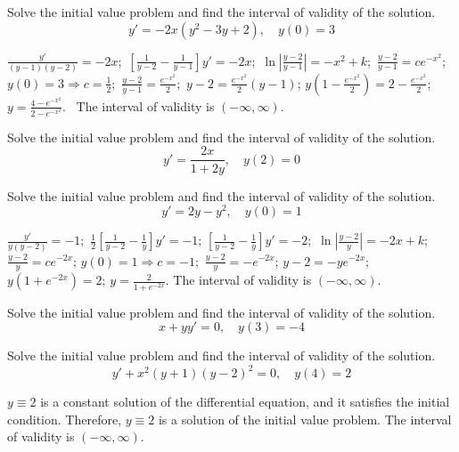\documentclass{ximera}
\begin{document}
\begin{problem}\label{exer:2.2.18} Solve the initial value problem and find the interval of validity of the solution.
$$y'=-2x(y^2-3y+2), \quad y(0)=3$$

 

\begin{solution}
    $\frac{y'}{(y-1)(y-2)}=-2x$;\ $\left[\frac{1}{
y-2}-\frac{1}{ y-1}\right]y'=-2x$;\ $\ln\left|\frac{y-2}{
y-1}\right|=-x^2+k$;\ $\frac{y-2}{ y-1}=ce^{-x^2}$;\;
$y(0)=3\Rightarrow c=\frac{1}{2}$;\ $\frac{y-2}{
y-1}=\frac{e^{-x^2}}{2}$;\ $y-2=\frac{e^{-x^2}}{2}(y-1)$;\;
$y\left(1-\frac{e^{-x^2}}{2}\right)=2-\frac{e^{-x^2}}{2}$;\;
$y=\frac{4-e^{-x^2}}{2-e^{-x^2}}$. \
The interval of validity is $(-\infty,\infty)$.
\end{solution}
\end{problem}

\begin{problem}\label{exer:2.2.19} Solve the initial value problem and find the interval of validity of the solution.
$$y'=\frac{2x}{1+2y},\quad y(2)=0$$ 
\end{problem}

\begin{problem}\label{exer:2.2.20} Solve the initial value problem and find the interval of validity of the solution.
$$y'=2y-y^2,\quad y(0)=1$$ 

 

\begin{solution}
    $\frac{y'}{ y(y-2)}=-1$;\ $\frac{1}{2}\left[\frac{1}{
y-2}-\frac{1}{ y}\right]y'=-1$;\;
 $\left[\frac{1}{
y-2}-\frac{1}{ y}\right]y'=-2$;\ $\ln\left|\frac{y-2}{
y}\right|=-2x+k$;\ $\frac{y-2}{ y}=ce^{-2x}$;\;
$y(0)=1\Rightarrow c=-1$;\ $\frac{y-2}{ y}=-e^{-2x}$;\;
$y-2=-ye^{-2x}$;\ $y(1+e^{-2x})=2$;\;
   $y=\frac{2}{
1+e^{-2x}}$. The interval of validity is $(-\infty,\infty)$.
\end{solution}
\end{problem}

\begin{problem}\label{exer:2.2.21} Solve the initial value problem and find the interval of validity of the solution.
$$x+yy'=0, \quad y(3) =-4$$
\end{problem}

\begin{problem}\label{exer:2.2.22} Solve the initial value problem and find the interval of validity of the solution.
$$y'+x^2(y+1)(y-2)^2=0, \quad y(4)=2$$

 

\begin{solution}
    $y\equiv2$ is a constant solution of the differential equation, and
it satisfies the initial condition. Therefore, $y\equiv2$ is a
solution of the initial value problem. The interval of validity is
$(-\infty,\infty)$.
\end{solution}
\end{problem}
\end{document}
